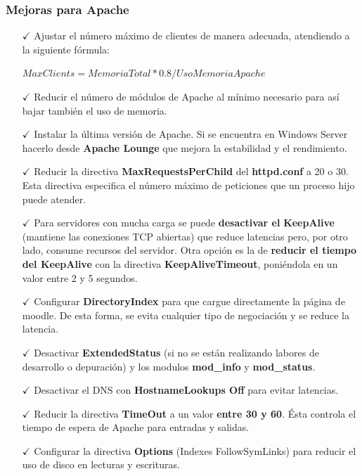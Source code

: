 \subsubsection{Mejoras para Apache\cite{enlace9}}
\begin{itemize}
	\item [$ \checkmark $] Ajustar el número máximo de clientes de manera adecuada, atendiendo a la siguiente fórmula:
	
	\textbf{$ MaxClients = MemoriaTotal * 0.8 / UsoMemoriaApache $}
	
	\item [$ \checkmark $] Reducir el número de módulos de Apache al mínimo necesario para así bajar también el uso de 
	memoria.	
	
	\item [$ \checkmark $] Instalar la última versión de Apache. Si se encuentra en Windows Server hacerlo desde \textbf{Apache Lounge} que mejora la estabilidad y el rendimiento.
	
	\item [$ \checkmark $] Reducir la directiva \textbf{MaxRequestsPerChild} del \textbf{httpd.conf} a 20 o 30. Esta directiva
	especifica el número máximo de peticiones que un proceso hijo puede atender.
	
	\item [$ \checkmark $] Para servidores con mucha carga se puede \textbf{desactivar el} \textbf{KeepAlive} (mantiene las conexiones
	TCP abiertas) que reduce latencias pero, por otro lado, consume recursos del servidor.
	Otra opción es la de \textbf{reducir el tiempo del KeepAlive} con la directiva \textbf{KeepAliveTimeout},
	poniéndola en un valor entre 2 y 5 segundos.
	
	\item [$ \checkmark $] Configurar \textbf{DirectoryIndex} para que cargue directamente la página de moodle. De
	esta forma, se evita cualquier tipo de negociación y se reduce la latencia.
	\item [$ \checkmark $] Desactivar \textbf{ExtendedStatus} (si no se están realizando labores de desarrollo o depuración)
	y los modulos \textbf{mod\_info} y \textbf{mod\_status}.
	
	\item [$ \checkmark $] Desactivar el DNS con \textbf{HostnameLookups Off} para evitar latencias.
	
	\item [$ \checkmark $] Reducir la directiva \textbf{TimeOut} a un valor \textbf{entre 30 y 60}. Ésta controla el tiempo
	de espera de Apache para entradas y salidas.
	
	\item [$ \checkmark $] Configurar la directiva \textbf{Options} (Indexes FollowSymLinks) para reducir el uso de disco en lecturas y
	escrituras.	
\end{itemize}

